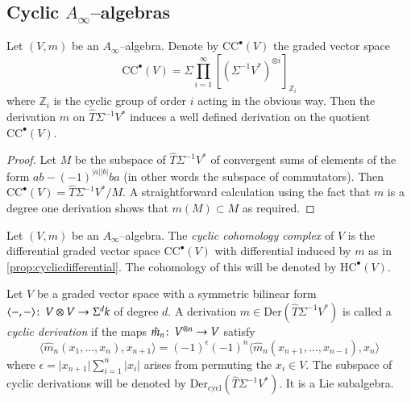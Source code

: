 \documentclass[british]{amsart}
\theoremstyle{plain}
\theoremstyle{definition}
{
\newaliascnt{{definition}}{theorem}\newtheorem{{definition}}[{definition}]{{Definition}}\aliascntresetthe{{definition}}\expandafterautorefname\endcsname{{Definition}}}
{
\newaliascnt{{remark}}{theorem}\newtheorem{{remark}}[{remark}]{{Remark}}\aliascntresetthe{{remark}}\expandafterautorefname\endcsname{{Remark}}}
{
\newaliascnt{{example}}{theorem}\newtheorem{{example}}[{example}]{{Example}}\aliascntresetthe{{example}}\expandafterautorefname\endcsname{{Example}}}
{
\newaliascnt{{examples}}{theorem}\newtheorem{{examples}}[{examples}]{{Examples}}\aliascntresetthe{{examples}}\expandafterautorefname\endcsname{{Examples}}}
{
\newaliascnt{{notation}}{theorem}\newtheorem{{notation}}[{notation}]{{Notation}}\aliascntresetthe{{notation}}\expandafterautorefname\endcsname{{Notation}}}
{
\newaliascnt{{convention}}{theorem}\newtheorem{{convention}}[{convention}]{{Convention}}\aliascntresetthe{{convention}}\expandafterautorefname\endcsname{{Convention}}}
\numberwithin{equation}{section}
\numberwithin{figure}{section}
\begin{document}
\subsection{Cyclic \texorpdfstring{$A_\infty$--}{A-infinity }algebras}

\begin{proposition}\label{prop:cyclicdifferential}
Let $(V, m)$ be an $A_\infty$--algebra. Denote by ${\mathrm{CC}}^{\bullet}(V)$ the graded vector space
\[
{\mathrm{CC}}^{\bullet}(V) = \Sigma \prod_{i=1}^{\infty}[(\Sigma^{-1}V^*)^{\otimes i}]_{\mathbb{Z}_i}
\]
where $\mathbb{Z}_i$ is the cyclic group of order $i$ acting in the obvious way. Then the derivation $m$ on $\widehat{T}\Sigma^{-1}V^*$ induces a well defined derivation on the quotient ${\mathrm{CC}}^{\bullet}(V)$.
\end{proposition}

\begin{proof}
Let $M$ be the subspace of $\widehat{T}\Sigma^{-1}V^*$ of convergent sums of elements of the form $ab-(-1)^{{\lvert {a} \rvert}{\lvert {b} \rvert}}ba$ (in other words the subspace of commutators). Then ${\mathrm{CC}}^\bullet(V)=\widehat{T}\Sigma^{-1}V^*/M$. A straightforward calculation using the fact that $m$ is a degree one derivation shows that $m(M)\subset M$ as required.
\end{proof}

\begin{definition}
Let $(V,m)$ be an $A_\infty$--algebra. The \emph{cyclic cohomology complex} of $V$ is the differential graded vector space ${\mathrm{CC}}^{\bullet}(V)$ with differential induced by $m$ as in \autoref{prop:cyclicdifferential}. The cohomology of this will be denoted by ${\mathrm{HC}}^{\bullet}(V)$.
\end{definition}

Let $V$ be a graded vector space with a symmetric bilinear form $\langle -, - \rangle {\colon\thinspace} V\otimes V \rightarrow \Sigma^d k$ of degree $d$. A derivation $m\in{\mathrm{Der}}(\widehat{T}\Sigma^{-1}V^*)$ is called a \emph{cyclic derivation} if the maps $\hat{m}_n{\colon\thinspace} V^{\otimes n}\rightarrow V$ satisfy
\begin{equation}\label{eq:cycliccondition}
\langle \hat{m}_n(x_1,\dots , x_n), x_{n+1} \rangle = (-1)^\epsilon(-1)^n \langle \hat{m}_n(x_{n+1},\dots, x_{n-1}), x_n \rangle
\end{equation}
where $\epsilon = {\lvert {x_{n+1}} \rvert}\sum_{i=1}^n {\lvert {x_i} \rvert}$ arises from permuting the $x_i\in V$. The subspace of cyclic derivations will be denoted by ${\mathrm{Der}}_{\mathrm{cycl}}(\widehat{T}\Sigma^{-1}V^*)$. It is a Lie subalgebra.
\end{document}
